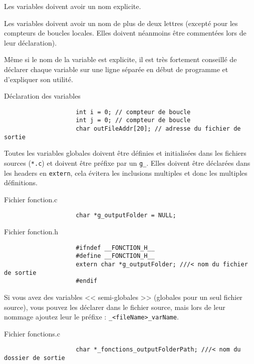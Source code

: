 			Les variables doivent avoir un nom explicite.

			Les variables doivent avoir un nom de plus de deux lettres (excepté pour les compteurs de boucles locales. Elles doivent néanmoins être commentées lors de leur déclaration).

			Même si le nom de la variable est explicite, il est très fortement conseillé de déclarer chaque variable sur une ligne séparée en début de programme et d'expliquer son utilité.

			\begin{cbox}{Déclaration des variables}
				\begin{verbatim}
					int i = 0; // compteur de boucle
					int j = 0; // compteur de boucle
					char outFileAddr[20]; // adresse du fichier de sortie
				\end{verbatim}
			\end{cbox}
			
			Toutes les variables globales doivent être définies et initialisées dans les fichiers sources (\verb+*.c+) et doivent être préfixe par un \verb+g_+. Elles doivent être déclarées dans les headers en \verb+extern+, cela évitera les inclusions multiples et donc les multiples définitions.

			\begin{cbox}{Fichier fonction.c}
				\begin{verbatim}
					char *g_outputFolder = NULL;
				\end{verbatim}
			\end{cbox}

			\begin{cbox}{Fichier fonction.h}
				\begin{verbatim}
					#ifndef __FONCTION_H__
					#define __FONCTION_H__
					extern char *g_outputFolder; ///< nom du fichier de sortie
					#endif
				\end{verbatim}
			\end{cbox}

			Si vous avez des variables << semi-globales >> (globales pour un seul fichier source), vous pouvez les déclarer dans le fichier source, mais lors de leur nommage ajoutez leur le préfixe : \verb+_<fileName>_varName+.

			\begin{cbox}{Fichier fonctions.c}
				\begin{verbatim}
					char *_fonctions_outputFolderPath; ///< nom du dossier de sortie
				\end{verbatim}
			\end{cbox}


